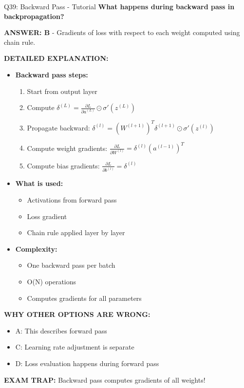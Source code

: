 \documentclass[8pt]{beamer}
\begin{document}
	\begin{frame}{Q39: Backward Pass - Tutorial}
		\fontsize{6.5}{7.5}\selectfont
		\textbf{What happens during backward pass in backpropagation?}
		
		\vspace{0.05cm}
		\textcolor{myblue}{\textbf{ANSWER: B}} - Gradients of loss with respect to each weight computed using chain rule.
		
		\vspace{0.05cm}
		\textbf{DETAILED EXPLANATION:}
		\begin{itemize}
			\item \textbf{Backward pass steps:}
			\begin{enumerate}
				\item Start from output layer
				\item Compute $\delta^{(L)} = \frac{\partial L}{\partial a^{(L)}} \odot \sigma'(z^{(L)})$
				\item Propagate backward: $\delta^{(l)} = (W^{(l+1)})^T \delta^{(l+1)} \odot \sigma'(z^{(l)})$
				\item Compute weight gradients: $\frac{\partial L}{\partial W^{(l)}} = \delta^{(l)} (a^{(l-1)})^T$
				\item Compute bias gradients: $\frac{\partial L}{\partial b^{(l)}} = \delta^{(l)}$
			\end{enumerate}
			\item \textbf{What is used:}
			\begin{itemize}
				\item Activations from forward pass
				\item Loss gradient
				\item Chain rule applied layer by layer
			\end{itemize}
			\item \textbf{Complexity:}
			\begin{itemize}
				\item One backward pass per batch
				\item O(N) operations
				\item Computes gradients for all parameters
			\end{itemize}
		\end{itemize}
		
		\vspace{0.05cm}
		\textcolor{myred}{\textbf{WHY OTHER OPTIONS ARE WRONG:}}
		\begin{itemize}
			\item \textcolor{myred}{A:} This describes forward pass
			\item \textcolor{myred}{C:} Learning rate adjustment is separate
			\item \textcolor{myred}{D:} Loss evaluation happens during forward pass
		\end{itemize}
		
		\textcolor{myred}{\textbf{EXAM TRAP:}} Backward pass computes \textcolor{myblue}{gradients} of all weights!
	\end{frame}
	
\end{document}
